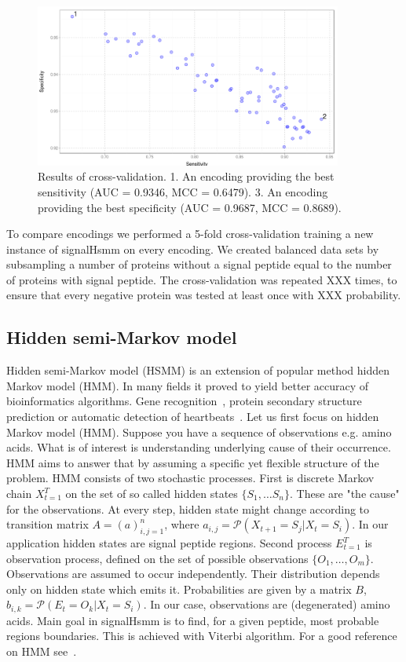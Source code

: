 \documentclass[fleqn,10pt,twoside]{gcb15submission}
\begin{document}
\begin{figure}[ht]\centering
\includegraphics[width=0.9\textwidth]{figures/cvres.png}
\caption{Results of cross-validation. 1. An encoding providing the best sensitivity (AUC = 0.9346, MCC = 0.6479). 3. An encoding providing the best specificity (AUC = 0.9687, MCC = 0.8689).}
\label{fig:cvres}
\end{figure}

To compare encodings we performed a 5-fold cross-validation training a new instance of signalHsmm on every encoding. We created balanced data sets by subsampling a number of proteins without a signal peptide equal to the number of proteins with signal peptide. The cross-validation was repeated XXX times, to ensure that every negative protein was tested at least once with XXX probability.


\subsection*{Hidden semi-Markov model}
Hidden semi-Markov model (HSMM) is an extension of popular method  hidden Markov model (HMM).
In many fields it proved to yield better accuracy of bioinformatics algorithms.
Gene recognition~\citep{Pachter02applicationsof}, protein secondary structure prediction  \citep{16571137}
or automatic detection of heartbeats~\citep{7043102}.
Let us first focus on hidden Markov model (HMM). 
Suppose you have a sequence of observations e.g. amino acids. What is of interest is understanding underlying cause of their occurrence. 
HMM aims to answer that by assuming a specific yet flexible structure of the problem.
HMM consists of two stochastic processes. First is discrete Markov chain $X_{t=1}^T$ on the set of so called hidden states $\{S_1, \dots S_n\}$.
These are "the cause" for the observations. At every step, hidden state might change according to transition matrix
$A= (a)_{i,j=1}^n$, where $a_{i,j} = \mathcal{P}(X_{t+1} = S_j | X_t = S_i)$. In our application hidden states are signal peptide regions.
Second process $E_{t=1}^T$ is observation process, defined on the set of possible observations $\{O_1, \dots, O_m\}$. 
Observations are assumed to occur independently. Their distribution depends only on hidden state which emits it. 
Probabilities are given by a matrix $B$, $b_{i,k} = \mathcal{P}(E_t = O_k | X_t = S_i)$.
In our case, observations are (degenerated) amino acids.
Main goal in signalHsmm is to find, for a given peptide, most probable regions boundaries. This is achieved with
Viterbi algorithm.
For a good reference on HMM see~\citep{1989rabinera}.
\end{document}

